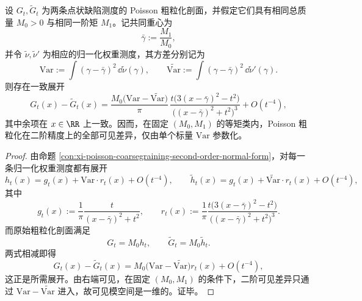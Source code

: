 \begin{proposition}[固定一阶矩类中的二阶可见模空间是一维]\label{prop:conclusion-poisson-second-order-visible-moduli-one-dimensional}
设 \(G_t,\widetilde G_t\) 为两条点状缺陷测度的 Poisson 粗粒化剖面，并假定它们具有相同总质量 \(M_0>0\) 与相同一阶矩 \(M_1\)。记共同重心为
\[
\bar\gamma:=\frac{M_1}{M_0},
\]
并令 \(\tilde\nu,\tilde\nu'\) 为相应的归一化权重测度，其方差分别记为
\[
\mathrm{Var}:=\int (\gamma-\bar\gamma)^2\,\dd\tilde\nu(\gamma),
\qquad
\widetilde{\mathrm{Var}}:=\int (\gamma-\bar\gamma)^2\,\dd\tilde\nu'(\gamma).
\]
则存在一致展开
\[
G_t(x)-\widetilde G_t(x)
=
\frac{M_0\bigl(\mathrm{Var}-\widetilde{\mathrm{Var}}\bigr)}{\pi}\,
\frac{t\bigl(3(x-\bar\gamma)^2-t^2\bigr)}{\bigl((x-\bar\gamma)^2+t^2\bigr)^3}
+O(t^{-4}),
\]
其中余项在 \(x\in\RR\) 上一致。因而，在固定 \((M_0,M_1)\) 的等矩类内，Poisson 粗粒化在二阶精度上的全部可见差异，仅由单个标量 \(\mathrm{Var}\) 参数化。
\end{proposition}
\begin{proof}
由命题 \ref{con:xi-poisson-coarsegraining-second-order-normal-form}，对每一条归一化权重测度都有展开
\[
h_t(x)=g_t(x)+\mathrm{Var}\cdot r_t(x)+O(t^{-4}),
\qquad
\widetilde h_t(x)=g_t(x)+\widetilde{\mathrm{Var}}\cdot r_t(x)+O(t^{-4}),
\]
其中
\[
g_t(x):=\frac{1}{\pi}\frac{t}{(x-\bar\gamma)^2+t^2},
\qquad
r_t(x):=\frac{1}{\pi}\frac{t\bigl(3(x-\bar\gamma)^2-t^2\bigr)}{\bigl((x-\bar\gamma)^2+t^2\bigr)^3}.
\]
而原始粗粒化剖面满足
\[
G_t=M_0h_t,
\qquad
\widetilde G_t=M_0\widetilde h_t.
\]
两式相减即得
\[
G_t(x)-\widetilde G_t(x)
=
M_0\bigl(\mathrm{Var}-\widetilde{\mathrm{Var}}\bigr)r_t(x)+O(t^{-4}),
\]
这正是所需展开。由右端可见，在固定 \((M_0,M_1)\) 的条件下，二阶可见差异只通过 \(\mathrm{Var}-\widetilde{\mathrm{Var}}\) 进入，故可见模空间是一维的。证毕。
\end{proof}

